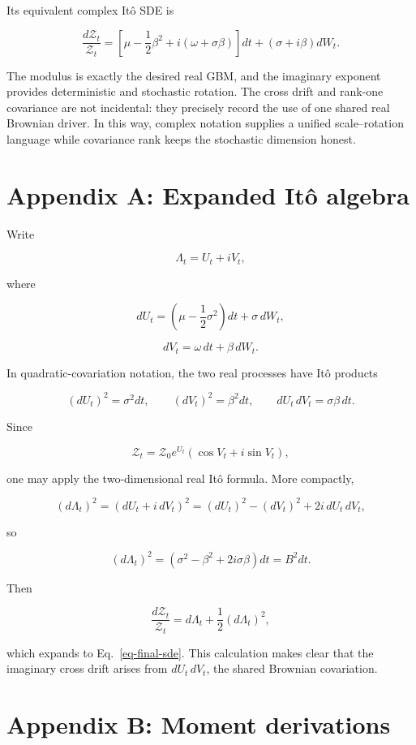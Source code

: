 \documentclass[
  english,
  10pt,
  letterpaper,
  DIV=11,
  numbers=noendperiod]{scrartcl}
\begin{document}
Its equivalent complex Itô SDE is

\[
\boxed{
\frac{d\mathcal Z_t}{\mathcal Z_t}
=
\left[
\mu-\frac12\beta^2+i(\omega+\sigma\beta)
\right]dt
+(\sigma+i\beta)dW_t.
}
\]

The modulus is exactly the desired real GBM, and the imaginary exponent
provides deterministic and stochastic rotation. The cross drift and
rank-one covariance are not incidental: they precisely record the use of
one shared real Brownian driver. In this way, complex notation supplies
a unified scale--rotation language while covariance rank keeps the
stochastic dimension honest.

\section{Appendix A: Expanded Itô algebra}\label{sec-appendix-ito}

Write

\[
\Lambda_t=U_t+iV_t,
\]

where

\[
dU_t
=
\left(\mu-\frac12\sigma^2\right)dt+\sigma\,dW_t,
\]

\[
dV_t=\omega\,dt+\beta\,dW_t.
\]

In quadratic-covariation notation, the two real processes have Itô
products

\[
(dU_t)^2=\sigma^2dt,\qquad
(dV_t)^2=\beta^2dt,\qquad
dU_t\,dV_t=\sigma\beta\,dt.
\]

Since

\[
\mathcal Z_t=\mathcal Z_0e^{U_t}(\cos V_t+i\sin V_t),
\]

one may apply the two-dimensional real Itô formula. More compactly,

\[
(d\Lambda_t)^2
=(dU_t+i\,dV_t)^2
=
(dU_t)^2-(dV_t)^2+2i\,dU_t\,dV_t,
\]

so

\[
(d\Lambda_t)^2
=
(\sigma^2-\beta^2+2i\sigma\beta)dt
=B^2dt.
\]

Then

\[
\frac{d\mathcal Z_t}{\mathcal Z_t}
=d\Lambda_t+\frac12(d\Lambda_t)^2,
\]

which expands to Eq.~\ref{eq-final-sde}. This calculation makes clear
that the imaginary cross drift arises from \(dU_t\,dV_t\), the shared
Brownian covariation.

\section{Appendix B: Moment derivations}\label{sec-appendix-moments}
\end{document}

